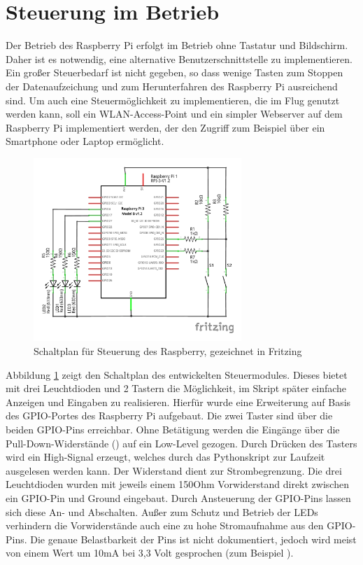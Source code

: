 \documentclass[a4paper,12pt,bibliography=totoc, listof=totoc,titlepage]{scrreprt}
\begin{document}
\section{Steuerung im Betrieb}
\label{s:steuermodul}
Der Betrieb des Raspberry Pi erfolgt im Betrieb ohne Tastatur und Bildschirm. Daher ist es notwendig, eine alternative Benutzerschnittstelle zu implementieren. Ein großer Steuerbedarf ist nicht gegeben, so dass wenige Tasten zum Stoppen der Datenaufzeichung und zum Herunterfahren des Raspberry Pi ausreichend sind. Um auch eine Steuermöglichkeit zu implementieren, die im Flug genutzt werden kann, soll ein WLAN-Access-Point und ein simpler Webserver auf dem Raspberry Pi implementiert werden, der den Zugriff zum Beispiel über ein Smartphone oder Laptop ermöglicht.

\begin{figure}[ht!]
 \centering
 \includegraphics[width=0.7\textwidth]{img/steuerung.pdf}
 \caption{Schaltplan für Steuerung des Raspberry, gezeichnet in Fritzing}
 \label{abb:steuerung}
\end{figure}

Abbildung \ref{abb:steuerung} zeigt den Schaltplan des entwickelten Steuermodules. Dieses bietet mit drei Leuchtdioden und 2 Tastern die Möglichkeit, im Skript später einfache Anzeigen und Eingaben zu realisieren. Hierfür wurde eine Erweiterung auf Basis des GPIO-Portes des Raspberry Pi aufgebaut. Die zwei Taster sind über die beiden GPIO-Pins  erreichbar. Ohne Betätigung werden die Eingänge über die Pull-Down-Widerstände () auf ein Low-Level gezogen. Durch Drücken des Tasters wird ein High-Signal erzeugt, welches durch das Pythonskript zur Laufzeit ausgelesen werden kann. Der Widerstand  dient zur Strombegrenzung.
Die drei Leuchtdioden wurden mit jeweils einem 150Ohm Vorwiderstand direkt zwischen ein GPIO-Pin und Ground eingebaut. Durch Ansteuerung der GPIO-Pins lassen sich diese An- und Abschalten. Außer zum Schutz und Betrieb der LEDs verhindern die Vorwiderstände auch eine zu hohe Stromaufnahme aus den GPIO-Pins. Die genaue Belastbarkeit der Pins ist nicht dokumentiert, jedoch wird meist von einem Wert um 10mA bei 3,3 Volt gesprochen (zum Beispiel \citet{ekRaspPin}).
\end{document}
